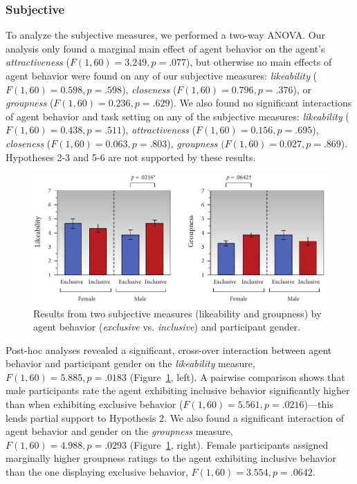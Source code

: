 \subsubsection{Subjective}

To analyze the subjective measures, we performed a two-way ANOVA. Our analysis only found a marginal main effect of agent behavior on the agent's \emph{attractiveness} ($F(1, 60) = 3.249, p = .077$), but otherwise no main effects of agent behavior were found on any of our subjective measures: \emph{likeability} ($F(1, 60) = 0.598, p = .598$), \emph{closeness} ($F(1, 60) = 0.796, p = .376$), or \emph{groupness} ($F(1, 60) = 0.236, p = .629$). We also found no significant interactions of agent behavior and task setting on any of the subjective measures: \emph{likeability} ($F(1, 60) = 0.438, p = .511$), \emph{attractiveness} ($F(1, 60) = 0.156, p = .695$), \emph{closeness} ($F(1, 60) = 0.063, p = .803$), \emph{groupness} $(F(1, 60) = 0.027, p = .869$). Hypotheses 2-3 and 5-6 are not supported by these results.

\begin{figure}
\centering
\includegraphics[width=1\textwidth]{conversationalrolegaze/Figures/ResultsSubjectiveGender.pdf}
\caption{Results from two subjective measures (likeability and groupness) by agent behavior (\emph{exclusive} vs. \emph{inclusive}) and participant gender.}
\label{fig:GazeFootingSubjectiveGender}
\end{figure}

Post-hoc analyses revealed a significant, cross-over interaction between agent behavior and participant gender on the \emph{likeability} measure, $F(1, 60) = 5.885, p = .0183$ (Figure~\ref{fig:GazeFootingSubjectiveGender}, left). A pairwise comparison shows that male participants rate the agent exhibiting inclusive behavior significantly higher than when exhibiting exclusive behavior ($F(1, 60) = 5.561, p = .0216$)---this lends partial support to Hypothesis 2. We also found a significant interaction of agent behavior and gender on the \emph{groupness} measure, $F(1, 60) = 4.988, p = .0293$ (Figure~\ref{fig:GazeFootingSubjectiveGender}, right). Female participants assigned marginally higher groupness ratings to the agent exhibiting inclusive behavior than the one displaying exclusive behavior, $F(1, 60) = 3.554, p = .0642$.

